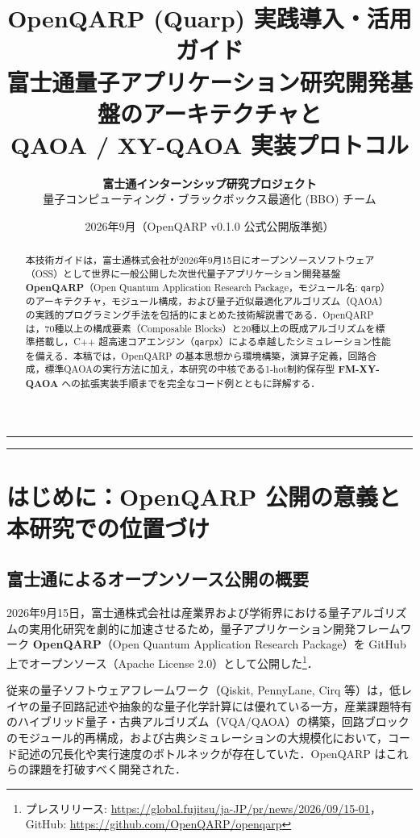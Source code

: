 \documentclass[11pt,a4paper]{ltjsarticle}
\title{
    \vspace{-10mm}
    \Huge\textbf{OpenQARP (Quarp) 実践導入・活用ガイド}\\[3mm]
    \Large 富士通量子アプリケーション研究開発基盤のアーキテクチャと\\
    QAOA / XY-QAOA 実装プロトコル
    \vspace{-2mm}
}
\author{
    \textbf{富士通インターンシップ研究プロジェクト} \\[1mm]
    量子コンピューティング・ブラックボックス最適化 (BBO) チーム
}
\date{2026年9月（OpenQARP v0.1.0 公式公開版準拠）}
\begin{document}
\maketitle

\begin{abstract}
本技術ガイドは，富士通株式会社が2026年9月15日にオープンソースソフトウェア（OSS）として世界に一般公開した次世代量子アプリケーション開発基盤 \textbf{OpenQARP}（Open Quantum Application Research Package，モジュール名: \texttt{qarp}）のアーキテクチャ，モジュール構成，および量子近似最適化アルゴリズム（QAOA）の実践的プログラミング手法を包括的にまとめた技術解説書である．OpenQARP は，70種以上の構成要素（Composable Blocks）と20種以上の既成アルゴリズムを標準搭載し，C++ 超高速コアエンジン（\texttt{qarpx}）による卓越したシミュレーション性能を備える．本稿では，OpenQARP の基本思想から環境構築，演算子定義，回路合成，標準QAOAの実行方法に加え，本研究の中核である1-hot制約保存型 \textbf{FM-XY-QAOA} への拡張実装手順までを完全なコード例とともに詳解する．
\end{abstract}

\vspace{2mm}
\hrule
\vspace{4mm}

\tableofcontents

\vspace{6mm}
\hrule
\vspace{6mm}

\section{はじめに：OpenQARP 公開の意義と本研究での位置づけ}

\subsection{富士通によるオープンソース公開の概要}
2026年9月15日，富士通株式会社は産業界および学術界における量子アルゴリズムの実用化研究を劇的に加速させるため，量子アプリケーション開発フレームワーク \textbf{OpenQARP}（Open Quantum Application Research Package）を GitHub 上でオープンソース（Apache License 2.0）として公開した\footnote{プレスリリース: \url{https://global.fujitsu/ja-JP/pr/news/2026/09/15-01}，GitHub: \url{https://github.com/OpenQARP/openqarp}}．

従来の量子ソフトウェアフレームワーク（Qiskit, PennyLane, Cirq 等）は，低レイヤの量子回路記述や抽象的な量子化学計算には優れている一方，産業課題特有のハイブリッド量子・古典アルゴリズム（VQA/QAOA）の構築，回路ブロックのモジュール的再構成，および古典シミュレーションの大規模化において，コード記述の冗長化や実行速度のボトルネックが存在していた．OpenQARP はこれらの課題を打破すべく開発された．
\end{document}
